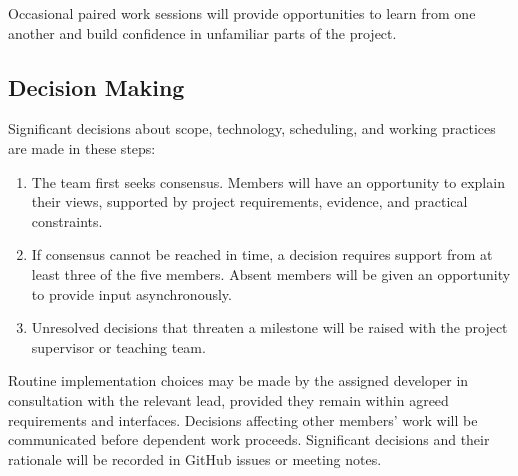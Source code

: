 \documentclass{article}
\begin{document}
Occasional paired work sessions will provide opportunities to learn
from one another and build confidence in unfamiliar parts of the
project.

\subsection*{Decision Making}

Significant decisions about scope, technology, scheduling, and working
practices are made in these steps:

\begin{enumerate}
    \item The team first seeks consensus. Members will have an opportunity
    to explain their views, supported by project requirements, evidence,
    and practical constraints.
    \item If consensus cannot be reached in time, a decision requires
    support from at least three of the five members. Absent members will
    be given an opportunity to provide input asynchronously.
    \item Unresolved decisions that threaten a milestone will be raised
    with the project supervisor or teaching team.
\end{enumerate}

Routine implementation choices may be made by the assigned developer
in consultation with the relevant lead, provided they remain within
agreed requirements and interfaces. Decisions affecting other
members' work will be communicated before dependent work proceeds.
Significant decisions and their rationale will be recorded in
GitHub issues or meeting notes.
\end{document}
